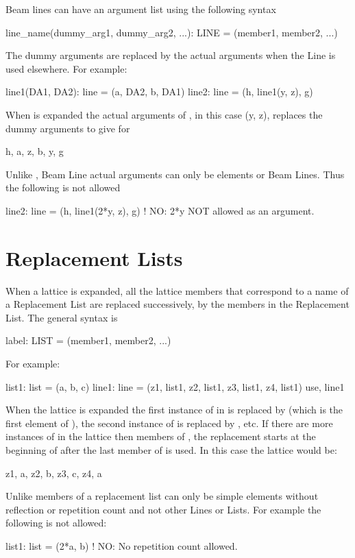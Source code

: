 Beam lines can have an argument list using the following syntax
\begin{example}
  line_name(dummy_arg1, dummy_arg2, ...): LINE = (member1, member2, ...)
\end{example}
The dummy arguments are replaced by the actual arguments when the Line is used
elsewhere. For example:
\begin{example}
  line1(DA1, DA2): line = (a, DA2, b, DA1)
  line2: line = (h, line1(y, z), g)
\end{example}
When  is expanded the actual arguments of , in this
case \vn(y, z), replaces the dummy arguments  to give for
\begin{example}
  h, a, z, b, y, g
\end{example} 
Unlike \mad, Beam Line actual arguments can only be elements or Beam Lines. 
Thus the following is not allowed
\begin{example}
  line2: line = (h, line1(2*y, z), g)   ! NO: 2*y NOT allowed as an argument.
\end{example}

\section{Replacement Lists}

When a lattice is expanded, all the lattice members that correspond to a 
name of a Replacement List 
are replaced successively, by the members
in the Replacement List. The general syntax is
\begin{example}
  label: LIST = (member1, member2, ...)
\end{example}
For example:
\begin{example}
  list1: list = (a, b, c)
  line1: line = (z1, list1, z2, list1, z3, list1, z4, list1)
  use, line1
\end{example}
When the lattice is expanded the first instance of  in
 is replaced by  (which is the first element of
), the second instance of  is replaced by ,
etc. If there are more instances of  in the lattice then
members of , the replacement starts at the beginning of
 after the last member of  is used. In this case the
lattice would be:
\begin{example}
  z1, a, z2, b, z3, c, z4, a
\end{example}
Unlike \mad members of a replacement list can only be simple elements 
without reflection or repetition count and not other Lines or Lists. 
For example the following is not allowed:
\begin{example}
  list1: list = (2*a, b)  ! NO: No repetition count allowed.
\end{example}

